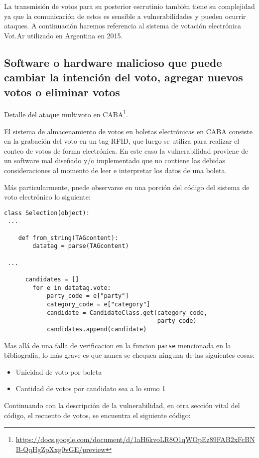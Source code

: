 La transmisión de votos para su posterior escrutinio también tiene su complejidad ya que la comunicación de estos es sensible a vulnerabilidades y pueden ocurrir ataques. A continuación haremos referencia al sistema de votación electrónica Vot.Ar utilizado en Argentina en 2015.

\subsection{Software o hardware malicioso que puede cambiar la intención del voto, agregar nuevos votos o eliminar votos}
Detalle del ataque multivoto en CABA\footnote{\url{https://docs.google.com/document/d/1aH6kvoLR8O1qWOpEz89FAB2xFcBNB-QqHgZpXxg0vGE/preview}}.

El sistema de almacenamiento de votos en boletas electrónicas en CABA consiste en la grabación del voto en un tag RFID, que luego se utiliza para realizar el conteo de votos de forma electrónica. En este caso la vulnerabilidad proviene de un software mal diseñado y/o implementado que no contiene las debidas consideraciones al momento de leer e interpretar los datos de una boleta.

Más particularmente, puede observarse en una porción del código del sistema de voto electrónico lo siguiente:

\begin{lstlisting}
class Selection(object):
 ...

    def from_string(TAGcontent):
        datatag = parse(TAGcontent)

 ...

      candidates = []
        for e in datatag.vote:
            party_code = e["party"]
            category_code = e["category"]
            candidate = CandidateClass.get(category_code,
                                           party_code)
            candidates.append(candidate)

\end{lstlisting}

Mas allá de una falla de verificacion en la funcion \texttt{parse} mencionada en la bibliografia, lo más grave es que nunca se chequea ninguna de las siguientes cosas:
\begin{itemize}
	\item Unicidad de voto por boleta
	\item Cantidad de votos por candidato sea a lo sumo 1
\end{itemize}

Continuando con la descripción de la vulnerabilidad, en otra sección vital del código, el recuento de votos, se encuentra el siguiente código:

